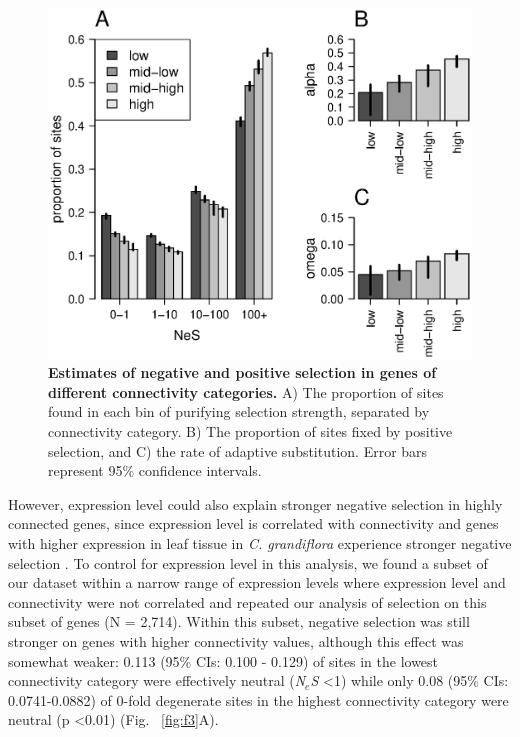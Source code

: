 \begin{figure}[ht!]
\centering
\includegraphics[width=\linewidth]{Ch4Fig2}
\caption{\textbf{Estimates of negative and positive selection in genes of different connectivity categories.} A) The proportion of sites found in each bin of purifying selection strength, separated by connectivity category. B) The proportion of sites fixed by positive selection, and C) the rate of adaptive substitution. Error bars represent 95\% confidence intervals.}
\label{fig:f2}
\end{figure}

However, expression level could also explain stronger negative selection in highly connected genes, since expression level is correlated with connectivity and genes with higher expression in leaf tissue in \textit{C. grandiflora} experience stronger negative selection \citep{Williamson2014-tf}. To control for expression level in this analysis, we found a subset of our dataset within a narrow range of expression levels where expression level and connectivity were not correlated and repeated our analysis of selection on this subset of genes (N = 2,714). Within this subset, negative selection was still stronger on genes with higher connectivity values, although this effect was somewhat weaker: 0.113 (95\% CIs: 0.100 - 0.129) of sites in the lowest connectivity category were effectively neutral (\textit{N$_{e}$S} \textless 1) while only 0.08 (95\% CIs: 0.0741-0.0882) of 0-fold degenerate sites in the highest connectivity category were neutral (p \textless 0.01) (Fig. ~\ref{fig:f3}A). 

